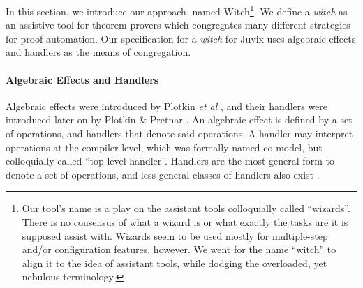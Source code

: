 \documentclass[sigconfl]{acmart}
\begin{document}
In this section, we introduce our approach, named Witch\footnote{Our tool's name is
  a play on the assistant tools colloquially called ``wizards''. There is no
  consensus of what a wizard is or what exactly the tasks are it is supposed
  assist with. Wizards seem to be used mostly for multiple-step and/or
  configuration features, however. We went for the name ``witch'' to align it to
  the idea of assistant tools, while dodging the overloaded, yet nebulous
  terminology.}. We define a \textit{witch} as an assistive tool for theorem
provers which congregates many different strategies for proof automation. Our
specification for a \textit{witch} for Juvix uses algebraic effects and handlers
as the means of congregation.

\paragraph{Algebraic Effects and Handlers} Algebraic effects were introduced by
Plotkin \textit{et al} \cite{Plotkin2003}, and their handlers were introduced later on by
Plotkin \& Pretnar \cite{Plotkin2013}. An
algebraic effect is defined by a set of
operations, and handlers that denote said operations. A handler may interpret
operations at the compiler-level, which was formally named co-model, but
colloquially called ``top-level handler''. Handlers are the most general form to
denote a set of operations, and less general classes of handlers also exist
\cite{DBLP:conf/esop/AhmanB20}.
\end{document}
